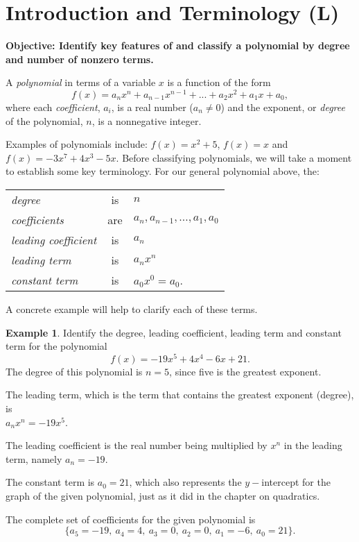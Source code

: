 \documentclass[12pt]{book}
\theoremstyle{definition}
\newtheorem{example}{Example}
\begin{document}
\section{Introduction and Terminology (L)}
%
{\bf Objective: Identify key features of and classify a polynomial by degree and number of nonzero terms.}\par
A {\it polynomial} in terms of a variable $x$ is a function of the form
$$f(x) = a_{n}x^{n} + a_{n-1}x^{n-1}+ ... + a_{2}x^2 + a_{1}x + a_{0},$$
where each {\it coefficient}, $a_{i}$, is a real number ($a_n\neq 0$) and the exponent, or {\it degree} of the polynomial, $n$, is a nonnegative integer.
\par
Examples of polynomials include: $f(x) = x^2 + 5$, $f(x)=x$ and $f(x) = -3x^7+4x^3-5x$.  Before classifying polynomials, we will take a moment to establish some key terminology. For our general polynomial above, the:
\begin{center}
\begin{tabular}{lcl}
{\it degree} & is & $n$\\
{\it coefficients} & are & $a_n,a_{n-1},\ldots,a_1,a_0$\\
{\it leading coefficient} & is & $a_n$\\
{\it leading term} & is & $a_nx^n$\\
{\it constant term} & is & $a_0x^0=a_0$.
\end{tabular}
\end{center}
A concrete example will help to clarify each of these terms.
\begin{example} Identify the degree, leading coefficient, leading term and constant term for the polynomial
$$f(x) = -19x^5+4x^4-6x+21.$$
The degree of this polynomial is $n=5$, since five is the greatest exponent.
\par
The leading term, which is the term that contains the greatest exponent (degree), is\\ $a_nx^n=-19x^5$.
\par
The leading coefficient is the real number being multiplied by $x^n$ in the leading term, namely $a_n=-19$.
\par
The constant term is $a_0=21$, which also represents the $y-$intercept for the graph of the given polynomial, just as it did in the chapter on quadratics.
\par
The complete set of coefficients for the given polynomial is
$$\{a_5=-19, \ a_4=4, \ a_3=0, \ a_2=0, \ a_1=-6, \ a_0=21\}.$$
\end{example}
\end{document}
